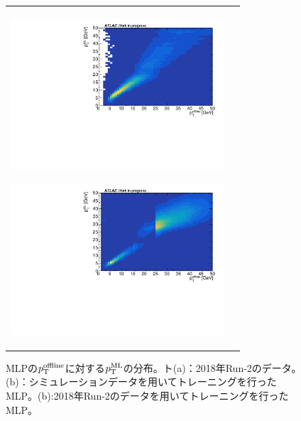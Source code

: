 \begin{figure}
    \begin{tabular}{cc}
    \centering
    \begin{minipage}[b]{0.45\hsize}%
        \centering
        \hspace*{-1cm}
        \includegraphics[clip, width=8cm]{fig/4/MC_pred_true_25.pdf}
        \subcaption{}
        \label{fig:zannsa_25_MC}
    \end{minipage}%
    \begin{minipage}[b]{0.7\hsize}%
        \centering
        \includegraphics[clip, width=8cm]{fig/4/pred_true_25_v1.pdf}
        \subcaption{}
        \label{fig:zannsa_25_Data}
    \end{minipage}%
    \end{tabular}
    \caption{MLPの$p_{\rm{T}}^{\rm{offline}}$に対する$p_{\rm{T}}^{\rm{ML}}$の分布。ト(a)：2018年Run-2のデータ。(b)：シミュレーションデータを用いてトレーニングを行ったMLP。(b):2018年Run-2のデータを用いてトレーニングを行ったMLP。}
    \label{25}
\end{figure}




